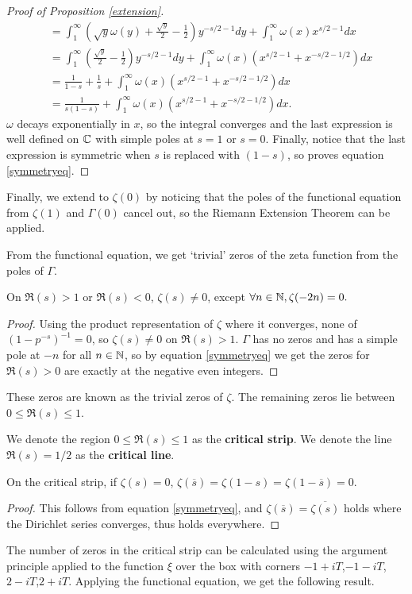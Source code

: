 \begin{proof}[Proof of Proposition \ref{extension}]
\begin{align*}
		&=\int_{1}^{\infty}\left(
		\sqrt{y}\omega(y) +\frac{\sqrt{y}}{2} - \frac{1}{2}
		\right) y^{-s/2-1} dy +
		\int_{1}^{\infty}\omega(x)  x^{s/2-1} dx\\
		&= \int_{1}^{\infty}\left(
			\frac{\sqrt{y}}{2} - \frac{1}{2}
			\right) y^{-s/2-1} dy+ \int_{1}^{\infty}\omega(x)  \left(x^{s/2-1} + x^{-s/2-1/2}\right)dx\\
		&= \frac{1}{1-s} + \frac{1}{s}+  \int_{1}^{\infty}\omega(x)  \left(x^{s/2-1} + x^{-s/2-1/2}\right)dx\\
		&= \frac{1}{s(1-s)}+ \int_{1}^{\infty}\omega(x)  \left(x^{s/2-1} + x^{-s/2-1/2}\right)dx.
	\end{align*}
	$\omega$ decays exponentially in $x$, so the integral converges and the last expression is well defined on $\mathbb{C}$ with simple poles at $s=1$ or $s=0$.
	Finally, notice that the last expression is symmetric when $s$ is replaced with $(1-s)$, so proves equation \ref{symmetryeq}.
\end{proof}
Finally, we extend to $\zeta(0)$ by noticing that the poles of the functional equation from $\zeta(1)$ and $\Gamma(0)$ cancel out, so the Riemann Extension Theorem can be applied.

From the functional equation, we get `trivial' zeros of the zeta function from the poles of $\Gamma$. 

\begin{corollary}
	On $\Re(s)>1$ or $\Re(s)<0$, $\zeta(s)\neq 0$, except $\forall n\in\mathbb{N}, \zeta(-2n)=0.$
\end{corollary}
\begin{proof}
	Using the product representation of $\zeta$ where it converges, none of $(1-p^{-s})^{-1} =0$, so $\zeta(s)\neq 0$ on $\Re(s)>1$.
	$\Gamma$ has no zeros and has a simple pole at $-n$ for all $n\in\mathbb{N}$, so by equation \ref{symmetryeq} we get the zeros for $\Re(s)>0$ are exactly at the negative even integers.
\end{proof}
These zeros are known as the trivial zeros of $\zeta$. The remaining zeros lie between $0\leq \Re(s) \leq 1$.
\begin{definition}
	We denote the region $0\leq \Re(s) \leq 1$ as the \textbf{critical strip}. We denote the line $\Re(s) = 1/2$ as the \textbf{critical line}.
\end{definition}

\begin{corollary}
	On the critical strip, if $\zeta(s)=0$, $\zeta(\overline{s})=\zeta(1-s)=\zeta(1-\overline{s})=0.$
\end{corollary}
\begin{proof}
	This follows from equation \ref{symmetryeq}, and $\zeta(\overline{s})=\overline{\zeta(s)}$ holds where the Dirichlet series converges, thus holds everywhere.
\end{proof}
The number of zeros in the critical strip can be calculated using the argument principle applied to the function $\xi$ over the box with corners $-1+iT$,$-1-iT$,$2-iT$,$2+iT$.
Applying the functional equation, we get the following result.

